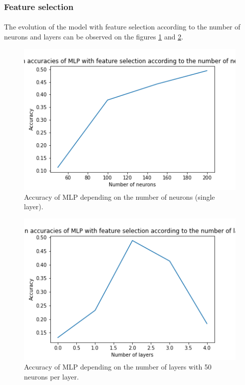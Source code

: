 \documentclass[a4paper, 11pt, oneside]{article}
\begin{document}
\subsubsection{Feature selection}

\paragraph{}The evolution of the model with feature selection according to the number of neurons and layers can be observed on the figures \ref{fig:mlp-feature-selection-neurons} and \ref{fig:mlp-feature-selection-layers}.

\begin{figure}[H]
\centering
\includegraphics[scale=0.4]{mlp/MLP_feature_selection_neurons.png}
\caption{Accuracy of MLP depending on the number of neurons (single layer).}
\label{fig:mlp-feature-selection-neurons}
\end{figure}

\begin{figure}[H]
\centering
\includegraphics[scale=0.4]{mlp/MLP_feature_selection_layers.png}
\caption{Accuracy of MLP depending on the number of layers with 50 neurons per layer.}
\label{fig:mlp-feature-selection-layers}
\end{figure}
\end{document}

